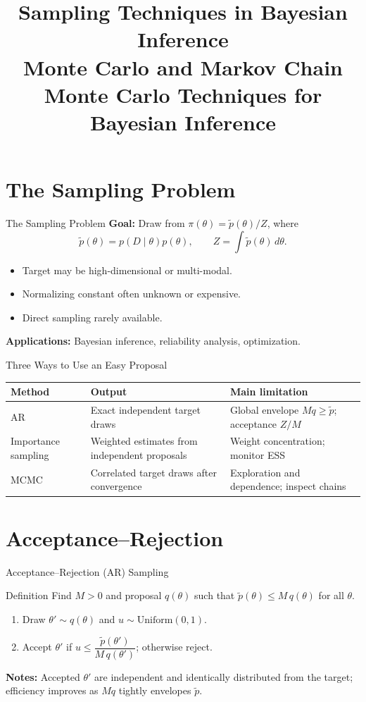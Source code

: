\documentclass[aspectratio=169]{ntuabeamer}
\title{Sampling Techniques in Bayesian Inference\\[0.25ex]\large Monte Carlo and Markov Chain Monte Carlo Techniques for Bayesian Inference}
\author{}
\date{}
\begin{document}
	
	\begin{frame}
		\makepresentationtitle
	\end{frame}
	
	
	\section{The Sampling Problem}
	\sectiondivider{The Sampling Problem}
	\begin{frame}{The Sampling Problem}
		\textbf{Goal:} Draw from $\pi(\theta)=\tilde p(\theta)/Z$, where
\[
 \tilde p(\theta)=p(D\mid\theta)p(\theta),\qquad Z=\int\tilde p(\theta)\,d\theta.
\]
		\begin{itemize}
			\item Target may be high-dimensional or multi-modal.
			\item Normalizing constant often unknown or expensive.
			\item Direct sampling rarely available.
		\end{itemize}
		\textbf{Applications:} Bayesian inference, reliability analysis, optimization.
	\end{frame}
	
	\begin{frame}{Three Ways to Use an Easy Proposal}
\small
\begin{tabular}{p{2.4cm}p{4cm}p{4cm}}
Method & Output & Main limitation\\\hline
AR & Exact independent target draws & Global envelope $Mq\ge\tilde p$; acceptance $Z/M$\\[0.8em]
Importance sampling & Weighted estimates from independent proposals & Weight concentration; monitor ESS\\[0.8em]
MCMC & Correlated target draws after convergence & Exploration and dependence; inspect chains\\
\end{tabular}
\end{frame}
\section{Acceptance--Rejection}
	\begin{frame}{Acceptance--Rejection (AR) Sampling}
		\begin{block}{Definition}
			Find $M>0$ and proposal $q(\theta)$ such that $\tilde p(\theta) \le M\,q(\theta)$ for all $\theta$.
		\end{block}
		\begin{enumerate}
			\item Draw $\theta'\sim q(\theta)$ and $u\sim \mathrm{Uniform}(0,1)$.
			\item Accept $\theta'$ if $u \le \dfrac{\tilde p(\theta')}{M\,q(\theta')}$; otherwise reject.
		\end{enumerate}
		\textbf{Notes:} Accepted $\theta'$ are independent and identically distributed from the target; efficiency improves as $Mq$ tightly envelopes $\tilde p$.
	\end{frame}
	
\end{document}
